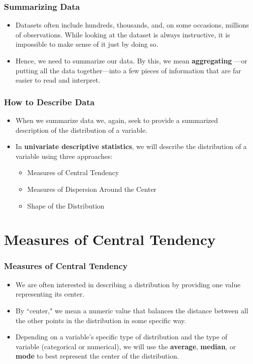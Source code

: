 \documentclass[handout]{beamer} %
\begin{document}
\begin{frame}
\frametitle{Summarizing Data}
\begin{itemize}
\item Datasets often include hundreds, thousands, and, on some occasions, millions of observations. While looking at the dataset is always instructive, it is impossible to make sense of it just by doing so.
\item Hence, we need to summarize our data. By this, we mean \textbf{aggregating} —or putting all the data together—into a few pieces of information that are far easier to read and interpret.
\end{itemize}
\end{frame}

\begin{frame}
\frametitle{How to Describe Data}
\begin{itemize}
\item When we summarize data we, again, seek to provide a summarized description of the distribution of a variable.
\item In \textbf{univariate descriptive statistics}, we will describe the distribution of a variable using three approaches:
\begin{itemize}
    \item Measures of Central Tendency
    \item Measures of Dispersion Around the Center
    \item Shape of the Distribution
\end{itemize}
\end{itemize}
\end{frame}

\section{Measures of Central Tendency}

\begin{frame}
\frametitle{Measures of Central Tendency}
\begin{itemize}
\item We are often interested in describing a distribution by providing one value representing its center.  \pause %
\item By ``center," we mean a numeric value that balances the distance between all the other points in the distribution in some specific way. \pause %
\item Depending on a variable's specific type of distribution and the type of variable (categorical or numerical), we will use the \textbf{average}, \textbf{median}, or \textbf{mode} to best represent the center of the distribution. 
\end{itemize}
\end{frame}
\end{document}
